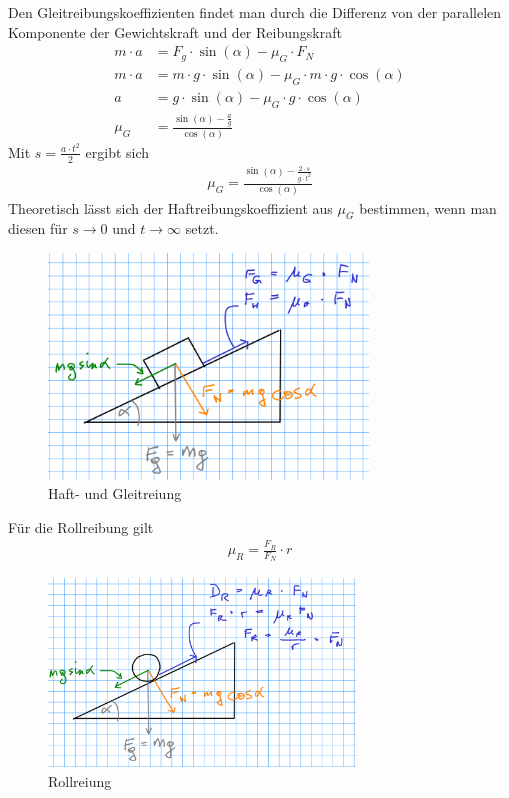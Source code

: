 \documentclass{article}
\begin{document}
Den Gleitreibungskoeffizienten findet man durch die Differenz von der parallelen Komponente der Gewichtskraft und der Reibungskraft
\begin{align}
m\cdot a &= F_g\cdot \sin(\alpha) - \mu_G \cdot F_N \\
m\cdot a &= m\cdot g\cdot \sin(\alpha) - \mu_G \cdot m\cdot g\cdot \cos(\alpha)\\
 a &= g\cdot \sin(\alpha) - \mu_G \cdot g\cdot \cos(\alpha) \\
  \mu_G &= \frac{\sin(\alpha) - \frac{a}{g}}{\cos(\alpha)}
\end{align}
Mit $s = \frac{a\cdot t^2}{ 2}$ ergibt sich
\begin{align}
\mu_G = \frac{\sin(\alpha) - \frac{2\cdot s}{g\cdot t^2}}{\cos(\alpha)}
\label{eq:gleitreibung}
\end{align}
Theoretisch lässt sich der Haftreibungskoeffizient aus $\mu_G$ bestimmen, wenn man diesen für $s\to 0$ und $t\to\infty$ setzt.

\begin{figure}[H]
\includegraphics[height=6cm]{reibung1.png}
\caption{Haft- und Gleitreiung}
\label{fig:haftgleitreibung}
\end{figure}



Für die Rollreibung gilt
\begin{align}
\mu_R = \frac{F_R}{F_N}\cdot r
\end{align}
\begin{figure}[H]
\includegraphics[height=5cm]{reibung2.png}
\caption{Rollreiung}
\label{fig:rollreibung}
\end{figure}
\end{document}

